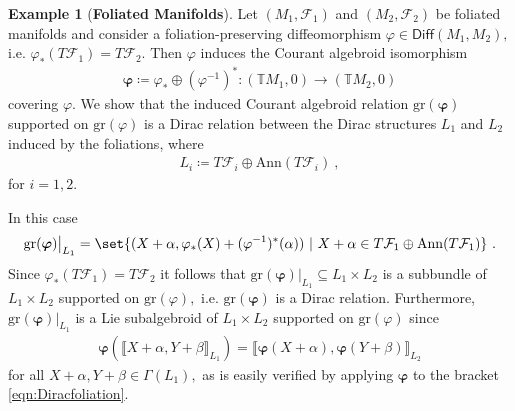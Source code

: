 \documentclass[a4paper, reqno, 11pt]{amsart}
\numberwithin{equation}{section}
\theoremstyle{definition}
\newtheorem{example}[equation]{Example}
\newcommand{\IT}{\mathbb{T}}
\newcommand{\cF}{{\mathcal F}}
\newcommand{\gr}{\text{gr}}
\theoremstyle{remark}
\begin{document}
\begin{example}[\textbf{Foliated Manifolds}]
Let $(M_1, \cF_1)$ and $(M_2, \cF_2)$ be foliated manifolds and consider a foliation-preserving diffeomorphism $\varphi \in \mathsf{Diff}(M_1, M_2),$ i.e. $\varphi_* (T\cF_1) = T\cF_2$. Then $\varphi$ induces the  Courant algebroid isomorphism 
\begin{align}
    \boldsymbol{\varphi} \coloneqq \varphi_* \oplus (\varphi^{-1})^* \colon (\IT M_1 ,0) \longrightarrow (\IT M_2 , 0)
\end{align}
covering $\varphi.$ We show that the induced Courant algebroid relation $\gr(\boldsymbol{\varphi})$ supported on $\gr(\varphi)$ is a Dirac relation between the Dirac structures $L_1$ and $L_2$ induced by the foliations, where
\begin{align}
 L_i \coloneqq T\cF_i \oplus \mathrm{Ann}(T\cF_i) \ ,   
\end{align}
for $i=1,2.$ 

In this case
\begin{align}
 \gr(\boldsymbol{\varphi}) \big\rvert_{L_1} = \set{(X + \alpha , \varphi_*(X) + (\varphi^{-1})^*(\alpha)) \ \vert \ X + \alpha \in T\cF_1 \oplus \mathrm{Ann}(T\cF_1)} \ .   
\end{align}
Since $\varphi_* (T\cF_1) = T\cF_2$ it follows that 
$\gr(\boldsymbol{\varphi}) \rvert_{L_1} \subseteq L_1 \times L_2$ is a subbundle of $L_1 \times L_2$ supported on $\gr(\varphi),$ i.e. $\gr(\boldsymbol{\varphi})$ is a Dirac relation. Furthermore, $\gr(\boldsymbol{\varphi})\rvert_{L_1}$ is a Lie subalgebroid of $L_1 \times L_2$ supported on $\gr(\varphi)$ since
\begin{align}
\boldsymbol{\varphi}(\llbracket X+\alpha , Y+\beta\rrbracket_{L_1}) = \llbracket \boldsymbol{\varphi}(X+\alpha), \boldsymbol{\varphi}(Y+\beta)\rrbracket_{L_2}
\end{align}
for all $X+\alpha, Y +\beta \in \mathsf{\Gamma}(L_1),$ as is easily verified by applying $\boldsymbol{\varphi}$ to the bracket \eqref{eqn:Diracfoliation}.
\end{example}
\end{document}
